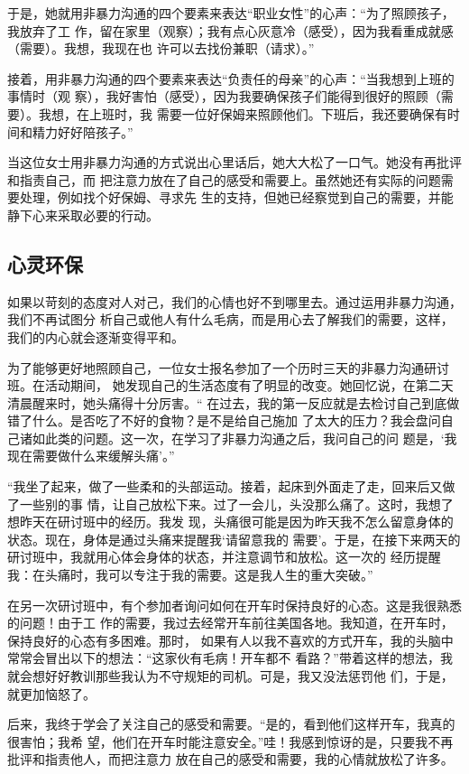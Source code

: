 \documentclass{ctexart}
\begin{document}
于是，她就用非暴力沟通的四个要素来表达``职业女性''的心声：``为了照顾孩子，我放弃了工
作，留在家里（观察）；我有点心灰意冷（感受），因为我看重成就感（需要）。我想，我现在也
许可以去找份兼职（请求）。''

接着，用非暴力沟通的四个要素来表达``负责任的母亲''的心声：``当我想到上班的事情时（观
察），我好害怕（感受），因为我要确保孩子们能得到很好的照顾（需要）。我想，在上班时，我
需要一位好保姆来照顾他们。下班后，我还要确保有时间和精力好好陪孩子。''

当这位女士用非暴力沟通的方式说出心里话后，她大大松了一口气。她没有再批评和指责自己，而
把注意力放在了自己的感受和需要上。虽然她还有实际的问题需要处理，例如找个好保姆、寻求先
生的支持，但她已经察觉到自己的需要，并能静下心来采取必要的行动。

\subsection{心灵环保}

如果以苛刻的态度对人对己，我们的心情也好不到哪里去。通过运用非暴力沟通，我们不再试图分
析自己或他人有什么毛病，而是用心去了解我们的需要，这样，我们的内心就会逐渐变得平和。

为了能够更好地照顾自己，一位女士报名参加了一个历时三天的非暴力沟通研讨班。在活动期间，
她发现自己的生活态度有了明显的改变。她回忆说，在第二天清晨醒来时，她头痛得十分厉害。``
在过去，我的第一反应就是去检讨自己到底做错了什么。是否吃了不好的食物？是不是给自己施加
了太大的压力？我会盘问自己诸如此类的问题。这一次，在学习了非暴力沟通之后，我问自己的问
题是，`我现在需要做什么来缓解头痛'。''

``我坐了起来，做了一些柔和的头部运动。接着，起床到外面走了走，回来后又做了一些别的事
情，让自己放松下来。过了一会儿，头没那么痛了。这时，我想了想昨天在研讨班中的经历。我发
现，头痛很可能是因为昨天我不怎么留意身体的状态。现在，身体是通过头痛来提醒我`请留意我的
需要'。于是，在接下来两天的研讨班中，我就用心体会身体的状态，并注意调节和放松。这一次的
经历提醒我：在头痛时，我可以专注于我的需要。这是我人生的重大突破。''

在另一次研讨班中，有个参加者询问如何在开车时保持良好的心态。这是我很熟悉的问题！由于工
作的需要，我过去经常开车前往美国各地。我知道，在开车时，保持良好的心态有多困难。那时，
如果有人以我不喜欢的方式开车，我的头脑中常常会冒出以下的想法：``这家伙有毛病！开车都不
看路？''带着这样的想法，我就会想好好教训那些我认为不守规矩的司机。可是，我又没法惩罚他
们，于是，就更加恼怒了。

后来，我终于学会了关注自己的感受和需要。``是的，看到他们这样开车，我真的很害怕；我希
望，他们在开车时能注意安全。''哇！我感到惊讶的是，只要我不再批评和指责他人，而把注意力
放在自己的感受和需要，我的心情就放松了许多。
\end{document}

